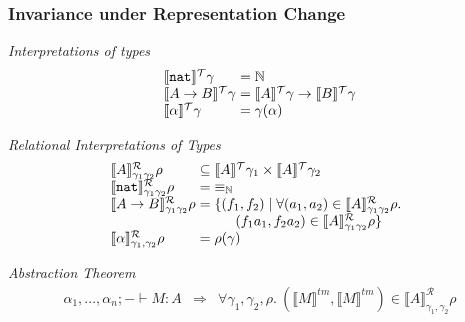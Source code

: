 \documentclass[xetex,serif,mathserif]{beamer}
\newcommand{\sepbar}{\mathrel|}
\newcommand{\tyPrimNm}[1]{\textup{\texttt{#1}}}
\newcommand{\tySem}[1]{\llbracket #1 \rrbracket^{\mathcal{T}}}
\newcommand{\tmSem}[1]{\llbracket #1 \rrbracket^{\mathit{tm}}}
\newcommand{\rsem}[3]{\llbracket #1 \rrbracket^{\mathcal{R}}_{#2}{#3}}
\newenvironment{slide}[1]{\begin{frame}\frametitle{#1}}{\end{frame}}
\begin{document}
\begin{slide}{Invariance under Representation Change}
  \textcolor{titlered}{\emph{Interpretations of types}}
  \begin{displaymath}
    \begin{array}{l@{\hspace{0.3em}}l}
      \tySem{\tyPrimNm{nat}}\gamma & = \mathbb{N} \\
      \tySem{A \to B}\gamma        & = \tySem{A}\gamma \to \tySem{B}\gamma \\
      \tySem{\alpha}\gamma         & = \gamma(\alpha) \\
    \end{array}
  \end{displaymath}

  \pause

  \textcolor{titlered}{\emph{Relational Interpretations of Types}}
  \begin{displaymath}
    \begin{array}{l@{\hspace{0.3em}}l}
      \rsem{A}{\gamma_1\gamma_2}\rho & \subseteq \tySem{A}\gamma_1 \times \tySem{A}\gamma_2 \\
      \rsem{\tyPrimNm{nat}}{\gamma_1\gamma_2}\rho & = \mathord\equiv_{\mathbb{N}} \\
      \rsem{A \to B}{\gamma_1\gamma_2}\rho & = \{
      \begin{array}[t]{@{}l}
        (f_1,f_2) \sepbar \forall (a_1,a_2) \in \rsem{A}{\gamma_1\gamma_2}\rho. \\
        \quad (f_1a_1,f_2a_2) \in \rsem{A}{\gamma_1\gamma_2}\rho \}
      \end{array} \\
      \rsem{\alpha}{\gamma_1,\gamma_2}\rho & = \rho(\gamma)
    \end{array}
  \end{displaymath}
  
  \pause

  \textcolor{titlered}{\emph{Abstraction Theorem}}
  \begin{displaymath}
    \begin{array}{lll}
      \alpha_1, ..., \alpha_n; - \vdash M : A & \Rightarrow & \forall \gamma_1, \gamma_2, \rho.~(\tmSem{M}, \tmSem{M}) \in \rsem{A}{\gamma_1,\gamma_2}\rho
    \end{array}
  \end{displaymath}
\end{slide}
\end{document}
